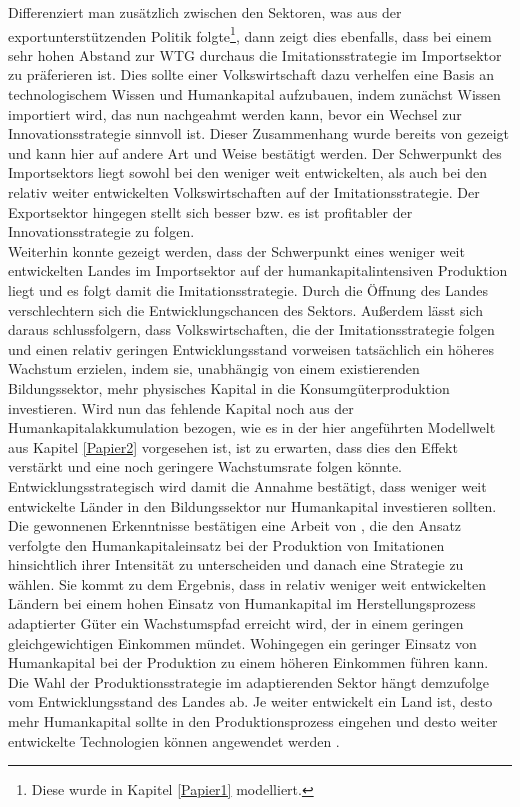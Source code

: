 Differenziert man zus{\"a}tzlich zwischen den Sektoren, was aus der exportunterst{\"u}tzenden Politik folgte\footnote{Diese wurde in Kapitel \ref{Papier1} modelliert.}, dann zeigt dies ebenfalls, dass bei einem sehr hohen Abstand zur WTG durchaus die Imitationsstrategie im Importsektor zu pr{\"a}ferieren ist. Dies sollte einer Volkswirtschaft dazu verhelfen eine Basis an technologischem Wissen und Humankapital aufzubauen, indem zun{\"a}chst Wissen importiert wird, das nun nachgeahmt werden kann, bevor ein Wechsel zur Innovationsstrategie sinnvoll ist. Dieser Zusammenhang wurde bereits von \citet{Glass.1999} gezeigt und kann hier auf andere Art und Weise best{\"a}tigt werden. Der Schwerpunkt des Importsektors liegt sowohl bei den weniger weit entwickelten, als auch bei den relativ weiter entwickelten Volkswirtschaften auf der Imitationsstrategie. Der Exportsektor hingegen stellt sich besser bzw. es ist profitabler der Innovationsstrategie zu folgen.\\ 
Weiterhin konnte gezeigt werden, dass der Schwerpunkt eines weniger weit entwickelten Landes im Importsektor auf der humankapitalintensiven Produktion liegt und es folgt damit die Imitationsstrategie. Durch die {\"O}ffnung des Landes verschlechtern sich die Entwicklungschancen des Sektors. 
Au{\ss}erdem l{\"a}sst sich daraus schlussfolgern, dass Volkswirtschaften, die der Imitationsstrategie folgen und einen relativ geringen Entwicklungsstand vorweisen tats{\"a}chlich ein h{\"o}heres Wachstum erzielen, indem sie, unabh{\"a}ngig von einem existierenden Bildungssektor, mehr physisches Kapital in die Konsumg{\"u}terproduktion investieren. Wird nun das fehlende Kapital noch aus der Humankapitalakkumulation bezogen, wie es in der hier angef{\"u}hrten Modellwelt aus Kapitel \ref{Papier2} vorgesehen ist, ist zu erwarten, dass dies den Effekt verst{\"a}rkt und eine noch geringere Wachstumsrate folgen k{\"o}nnte. Entwicklungsstrategisch wird damit die Annahme best{\"a}tigt, dass weniger weit entwickelte L{\"a}nder in den Bildungssektor nur Humankapital investieren sollten.\newline
Die gewonnenen Erkenntnisse best{\"a}tigen eine Arbeit von \citet{Mies.2013}, die den Ansatz verfolgte den Humankapitaleinsatz bei der Produktion von Imitationen hinsichtlich ihrer Intensit{\"a}t zu unterscheiden und danach eine Strategie zu w{\"a}hlen. Sie kommt zu dem Ergebnis, dass in relativ weniger weit entwickelten L{\"a}ndern bei einem hohen Einsatz von Humankapital im Herstellungsprozess adaptierter G{\"u}ter ein Wachstumspfad erreicht wird, der in einem geringen gleichgewichtigen Einkommen m{\"u}ndet. Wohingegen ein geringer Einsatz von Humankapital bei der Produktion zu einem h{\"o}heren Einkommen f{\"u}hren kann. Die Wahl der Produktionsstrategie im adaptierenden Sektor h{\"a}ngt demzufolge vom Entwicklungsstand des Landes ab. Je weiter entwickelt ein Land ist, desto mehr Humankapital sollte in den Produktionsprozess eingehen und desto weiter entwickelte Technologien k{\"o}nnen angewendet werden \citep{Mies.2013}.\\
